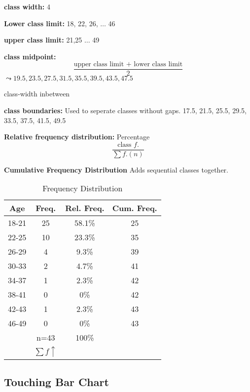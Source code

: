 \documentclass{book}
\begin{document}
\begin{multicols}{2}
    

\textbf{class width:} 4

\textbf{Lower class limit:} 18, 22, 26, $\ldots$ 46

\textbf{upper class limit:} 21,25 $\ldots$ 49

\textbf{class midpoint:}
\[ \frac{\text{upper class limit + lower class limit}}{2}\] 
$\leadsto 19.5, 23.5, 27.5, 31.5, 35.5, 39.5, 43.5, 47.5$

class-width inbetween

\textbf{class boundaries:}
Used to seperate classes without gaps.
17.5, 21.5, 25.5, 29.5, 33.5, 37.5, 41.5, 49.5

\textbf{Relative frequency distribution:} Percentage \[\frac{\text{class } f.}{\sum f. (n)}\]

\textbf{Cumulative Frequency Distribution}
Adds sequential classes together.
\end{multicols}

\begin{table}[htbp]
    \centering
    \begin{tabular}{c|c|c|c}
        \toprule
        Age & Freq. & Rel. Freq. & Cum. Freq.\\
        \midrule
        18-21 & 25 & 58.1\% & 25  \\
        22-25 & 10 & 23.3\% & 35  \\
        26-29 & 4  & 9.3\%  & 39  \\
        30-33 & 2  & 4.7\%  & 41  \\
        34-37 & 1  & 2.3\%  & 42  \\
        38-41 & 0  & 0\%    & 42  \\
        42-43 & 1  & 2.3\%  & 43  \\
        46-49 & 0  & 0\%    & 43  \\
        \midrule
              & n=43 & 100\% \\
              & $\sum f \uparrow $ \\
              \bottomrule
    \end{tabular}
    \caption{Frequency Distribution}
\end{table}



\subsection{Touching Bar Chart}
\end{document}
